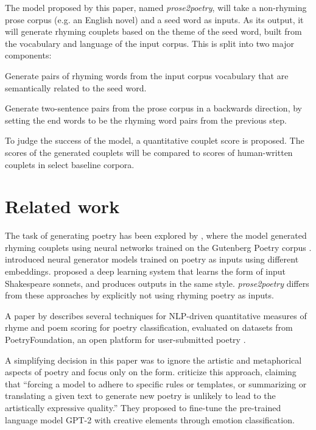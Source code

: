 \documentclass[11pt,a4paper]{article}
\newenvironment{tight_enumerate}{
\begin{enumerate}
\setlength{\itemsep}{0pt}
\setlength{\parskip}{0pt}
}{\end{enumerate}}
\begin{document}
The model proposed by this paper, named \textit{prose2poetry}, will take a non-rhyming prose corpus (e.g. an English novel) and a seed word as inputs. As its output, it will generate rhyming couplets based on the theme of the seed word, built from the vocabulary and language of the input corpus. This is split into two major components:
\begin{tight_enumerate}
	\vspace{-0.5em}
	\item
		Generate pairs of rhyming words from the input corpus vocabulary that are semantically related to the seed word.
	\item
		Generate two-sentence pairs from the prose corpus in a backwards direction, by setting the end words to be the rhyming word pairs from the previous step.
\end{tight_enumerate}
\vspace{-0.5em}

To judge the success of the model, a quantitative couplet score is proposed. The scores of the generated couplets will be compared to scores of human-written couplets in select baseline corpora.

\section{Related work}
\label{sec:related}

The task of generating poetry has been explored by \citet{cole}, where the model generated rhyming couplets using neural networks trained on the Gutenberg Poetry corpus \cite{gutenbergpoetry}. \citet{hopkins-kiela-2017} introduced neural generator models trained on poetry as inputs using different embeddings. \citet{Xie2017DeepP} proposed a deep learning system that learns the form of input Shakespeare sonnets, and produces outputs in the same style. \textit{prose2poetry} differs from these approaches by explicitly not using rhyming poetry as inputs.

A paper by \citet{keswarani} describes several techniques for NLP-driven quantitative measures of rhyme and poem scoring for poetry classification, evaluated on datasets from PoetryFoundation, an open platform for user-submitted poetry \cite*{poetryfoundation}.

A simplifying decision in this paper was to ignore the artistic and metaphorical aspects of poetry and focus only on the form. \citet{bena2020introducing} criticize this approach, claiming that ``forcing a model to adhere to specific rules or templates, or summarizing or translating a given text to generate new poetry is unlikely to lead to the artistically expressive quality.'' They proposed to fine-tune the pre-trained language model GPT-2 with creative elements through emotion classification.
\end{document}
